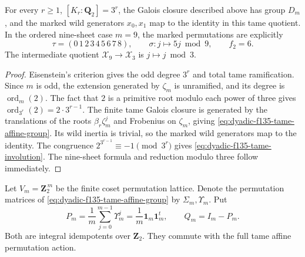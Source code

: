 \begin{lemma}
\label{lem:dyadic-f135-tame-affine-root-quotient}
For every $r\ge1$,
$[K_r:\mathbf Q_2]=3^r$,
the Galois closure described
above has group $D_m$,
and the marked wild generators
$x_0,x_1$ map to the identity
in this tame quotient.
In the ordered nine-sheet
case $m=9$, the marked
permutations are explicitly
\begin{equation}\label{eq:dyadic-f135-nine-tame-permutations}
\boxed{\quad
\tau=(0\,1\,2\,3\,4\,5\,6\,7\,8),\qquad
\sigma:j\mapsto5j\bmod9,\qquad
f_2=6.
\quad}
\end{equation}
The intermediate quotient
$\mathscr X_9\to\mathscr X_3$
is $j\mapsto j\bmod3$.
\end{lemma}

\begin{proof}
Eisenstein's criterion
gives the odd degree
$3^r$ and total tame
ramification.
Since $m$ is odd,
the extension generated
by $\zeta_m$ is
unramified, and its
degree is
$\operatorname{ord}_m(2)$.
The fact that $2$ is a
primitive root modulo
each power of three
gives
$\operatorname{ord}_{3^r}(2)
=2\cdot3^{r-1}$.
The finite tame Galois
closure is generated
by the translations of
the roots
$\beta_r\zeta_m^j$
and Frobenius on
$\zeta_m$, giving
\eqref{eq:dyadic-f135-tame-affine-group}.
Its wild inertia is
trivial, so the
marked wild generators
map to the identity.
The congruence
$2^{3^{r-1}}\equiv-1
\pmod{3^r}$
gives
\eqref{eq:dyadic-f135-tame-involution}.
The nine-sheet
formula and reduction
modulo three follow
immediately.
\end{proof}

Let $V_m=\mathbf Z_2^{\,m}$
be the finite coset
permutation lattice.
Denote the permutation
matrices of
\eqref{eq:dyadic-f135-tame-affine-group}
by $\Sigma_m,\Upsilon_m$.
Put
\begin{equation}\label{eq:dyadic-f135-coset-projector-and-augmentation}
\boxed{
P_m=\frac1m\sum_{j=0}^{m-1}\Upsilon_m^j
=\frac1m\mathbf1_m\mathbf1_m^t,
\qquad
Q_m=I_m-P_m.
}
\end{equation}
Both are integral
idempotents over
$\mathbf Z_2$.
They commute with
the full tame affine
permutation action.


